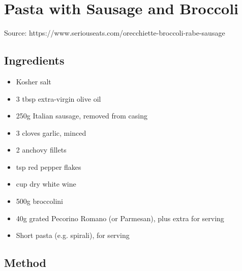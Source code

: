 \section{Pasta with Sausage and Broccoli}

  
Source: https://www.seriouseats.com/orecchiette-broccoli-rabe-sausage
  
\subsection{Ingredients}
  
\begin{itemize}
  \item Kosher salt
  \item 3 tbsp extra-virgin olive oil
  \item 250g Italian sausage, removed from casing
  \item 3 cloves garlic, minced
  \item 2 anchovy fillets
  \item {} tsp red pepper flakes
  \item {} cup dry white wine
  \item 500g broccolini
  \item 40g grated Pecorino Romano (or Parmesan), plus extra for serving
  \item Short pasta (e.g. spirali), for serving
\end{itemize}

\subsection{Method}

